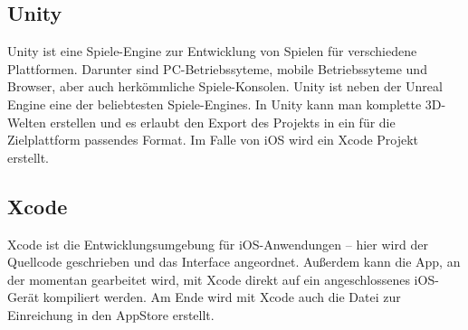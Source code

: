 \subsection{Unity}
Unity ist eine Spiele-Engine zur Entwicklung von Spielen für verschiedene Plattformen. Darunter sind PC-Betriebssyteme, mobile Betriebssyteme und Browser, aber auch herkömmliche Spiele-Konsolen. Unity ist neben der Unreal Engine eine der beliebtesten Spiele-Engines. In Unity kann man komplette 3D-Welten erstellen und es erlaubt den Export des Projekts in ein für die Zielplattform passendes Format. Im Falle von iOS wird ein Xcode Projekt erstellt. \cite{unity}

\subsection{Xcode}
Xcode ist die Entwicklungsumgebung für iOS-Anwendungen – hier wird der Quellcode geschrieben und das Interface angeordnet. Außerdem kann die App, an der momentan gearbeitet wird, mit Xcode direkt auf ein angeschlossenes iOS-Gerät kompiliert werden. Am Ende wird mit Xcode auch die Datei zur Einreichung in den AppStore erstellt. \cite{apple:003}